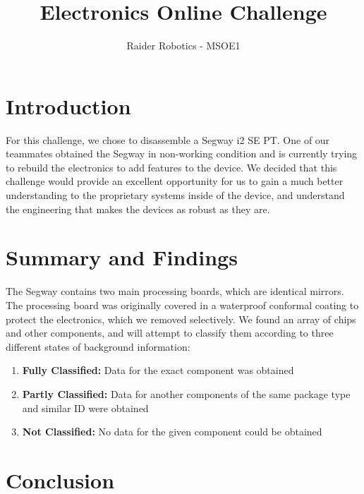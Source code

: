 \documentclass[]{formalLabReport}
\begin{document}
\title{Electronics Online Challenge}
\author{Raider Robotics - MSOE1}

\maketitle

\tableofcontents

\newpage

\section{Introduction}
For this challenge, we chose to disassemble a Segway i2 SE PT. One of our teammates obtained 
the Segway in non-working condition and is currently trying to rebuild the electronics to add
features to the device. We decided that this challenge would provide an excellent opportunity for
us to gain a much better understanding to the proprietary systems inside of the device, and understand
the engineering that makes the devices as robust as they are.

\section{Summary and Findings}
The Segway contains two main processing boards, which are identical mirrors. The processing board was
originally covered in a waterproof conformal coating to protect the electronics, which we removed selectively.
We found an array of chips and other components, and will attempt to classify them according to 
three different states of background information:
\begin{enumerate}
    \item \textbf{Fully Classified:} Data for the exact component was obtained
    \item \textbf{Partly Classified:} Data for another components of the same package type and similar ID were obtained
    \item \textbf{Not Classified:} No data for the given component could be obtained
\end{enumerate}

\section{Conclusion} 
\end{document}
